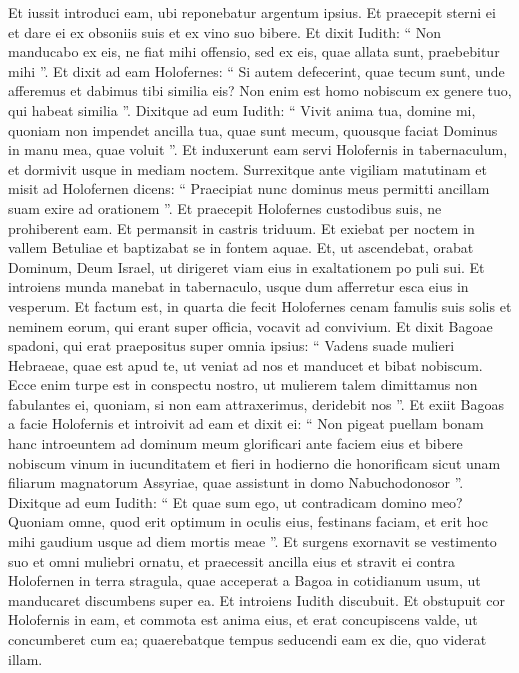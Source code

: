 \begin{biblechapter}
\begin{biblechapter}
\begin{biblechapter}
\begin{biblechapter}
\begin{biblechapter}
\begin{biblechapter}
\begin{biblechapter}
\begin{biblechapter}
\begin{biblechapter}
\begin{biblechapter}
\begin{biblechapter}
\begin{biblechapter}
\verse Et iussit introduci eam, ubi reponebatur argentum ipsius. Et praecepit sterni ei et dare ei ex obsoniis suis et ex vino suo bibere. 
\verse Et dixit Iudith: “ Non manducabo ex eis, ne fiat mihi offensio, sed ex eis, quae allata sunt, praebebitur mihi ”.
 \verse Et dixit ad eam Holofernes: “ Si autem defecerint, quae tecum sunt, unde afferemus et dabimus tibi similia eis? Non enim est homo nobiscum ex genere tuo, qui habeat similia ”. 
\verse Dixitque ad eum Iudith: “ Vivit anima tua, domine mi, quoniam non impendet ancilla tua, quae sunt mecum, quousque faciat Dominus in manu mea, quae voluit ”. 
\verse Et induxerunt eam servi Holofernis in tabernaculum, et dormivit usque in mediam noctem. Surrexitque ante vigiliam matutinam 
\verse et misit ad Holofernen dicens: “ Praecipiat nunc dominus meus permitti ancillam suam exire ad orationem ”. 
\verse Et praecepit Holofernes custodibus suis, ne prohiberent eam. Et permansit in castris triduum. Et exiebat per noctem in vallem Betuliae et baptizabat se in fontem aquae. 
\verse Et, ut ascendebat, orabat Dominum, Deum Israel, ut dirigeret viam eius in exaltationem po puli sui. 
\verse Et introiens munda manebat in tabernaculo, usque dum afferretur esca eius in vesperum.
 \verse Et factum est, in quarta die fecit Holofernes cenam famulis suis solis et neminem eorum, qui erant super officia, vocavit ad convivium. 
\verse Et dixit Bagoae spadoni, qui erat praepositus super omnia ipsius: “ Vadens suade mulieri Hebraeae, quae est apud te, ut veniat ad nos et manducet et bibat nobiscum. 
 \verse Ecce enim turpe est in conspectu nostro, ut mulierem talem dimittamus non fabulantes ei, quoniam, si non eam attraxerimus, deridebit nos ”. 
\verse Et exiit Bagoas a facie Holofernis et introivit ad eam et dixit ei: “ Non pigeat puellam bonam hanc introeuntem ad dominum meum glorificari ante faciem eius et bibere nobiscum vinum in iucunditatem et fieri in hodierno die honorificam sicut unam filiarum magnatorum Assyriae, quae assistunt in domo Nabuchodonosor ”. 
 \verse Dixitque ad eum Iudith: “ Et quae sum ego, ut contradicam domino meo? Quoniam omne, quod erit optimum in oculis eius, festinans faciam, et erit hoc mihi gaudium usque ad diem mortis meae ”.
 \verse Et surgens exornavit se vestimento suo et omni muliebri ornatu, et praecessit ancilla eius et stravit ei contra Holofernen in terra stragula, quae acceperat a Bagoa in cotidianum usum, ut manducaret discumbens super ea. 
\verse Et introiens Iudith discubuit. Et obstupuit cor Holofernis in eam, et commota est anima eius, et erat concupiscens valde, ut concumberet cum ea; quaerebatque tempus seducendi eam ex die, quo viderat illam. 

\end{biblechapter}
\end{biblechapter}
\end{biblechapter}
\end{biblechapter}
\end{biblechapter}
\end{biblechapter}
\end{biblechapter}
\end{biblechapter}
\end{biblechapter}
\end{biblechapter}
\end{biblechapter}
\end{biblechapter}
